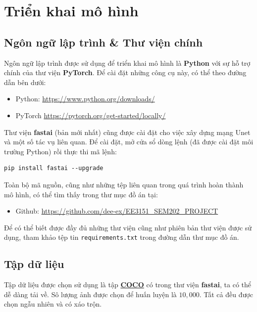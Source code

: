\documentclass[a4paper, 12pt]{article}
\begin{document}
\section{Triển khai mô hình}

\subsection{Ngôn ngữ lập trình \& Thư viện chính}
Ngôn ngữ lập trình được sử dụng để triển khai mô hình là \textbf{Python} với sự hỗ trợ chính của thư viện \textbf{PyTorch}. Để cài đặt những công cụ này, có thể theo đường dẫn bên dưới:
\begin{itemize}
    \item Python: \href{https://www.python.org/downloads/}{https://www.python.org/downloads/}
    \item PyTorch \href{https://pytorch.org/get-started/locally/}{https://pytorch.org/get-started/locally/}
\end{itemize}
Thư viện \textbf{fastai} (bản mới nhất) cũng được cài đặt cho việc xây dựng mạng Unet và một số tác vụ liên quan. Để cài đặt, mở cửa sổ dòng lệnh (đã được cài đặt môi trường Python) rồi thực thi mã lệnh:
\begin{lstlisting}
pip install fastai --upgrade
\end{lstlisting}

\noindent
Toàn bộ mã nguồn, cũng như những tệp liên quan trong quá trình hoàn thành mô hình, có thể tìm thấy trong thư mục đồ án tại:
\begin{itemize}
    \item Github: \href{https://github.com/dee-ex/EE3151\_SEM202\_PROJECT}{https://github.com/dee-ex/EE3151\_SEM202\_PROJECT}
\end{itemize}
Để có thể biết được đầy đủ những thư viện cũng như phiên bản thư viện được sử dụng, tham khảo tệp tin \texttt{requirements.txt} trong đường dẫn thư mục đồ án.

\subsection{Tập dữ liệu}
Tập dữ liệu được chọn sử dụng là tập \href{https://cocodataset.org/#download}{\textbf{COCO}} có trong thư viện \textbf{fastai}, ta có thể dễ dàng tải về. Sô lượng ảnh được chọn để huấn luyện là $10,000$. Tất cả đều được chọn ngẫu nhiên và có xáo trộn.
\end{document}
